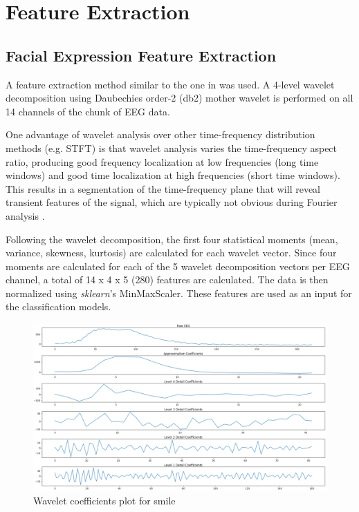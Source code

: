 \section{Feature Extraction}
\subsection{Facial Expression Feature Extraction}
A feature extraction method similar to the one in \cite{14} was used. A 4-level wavelet decomposition using Daubechies order-2 (db2) mother wavelet is performed on all 14 channels of the chunk of EEG data.

One advantage of wavelet analysis over other time-frequency distribution methods (e.g. STFT) is that wavelet analysis varies the time-frequency aspect ratio, producing good frequency localization at low frequencies (long time windows) and good time localization at high frequencies (short time windows). This results in a segmentation of the time-frequency plane that will reveal transient features of the signal, which are typically not obvious during Fourier analysis \cite{14}. 

Following the wavelet decomposition, the first four statistical moments (mean, variance, skewness, kurtosis) are calculated for each wavelet vector. Since four moments are calculated for each of the 5 wavelet decomposition vectors per EEG channel, a total of 14 x 4 x 5 (280) features are calculated. The data is then normalized using \textit{sklearn}'s MinMaxScaler. These features are used as an input for the classification models.
 
\begin{figure}[htbp]
	\centering
		\includegraphics[width=1\columnwidth]{smileWavelets.png}
	\caption{Wavelet coefficients plot for smile}
	\label{fig:smileWavelets}
\end{figure}

